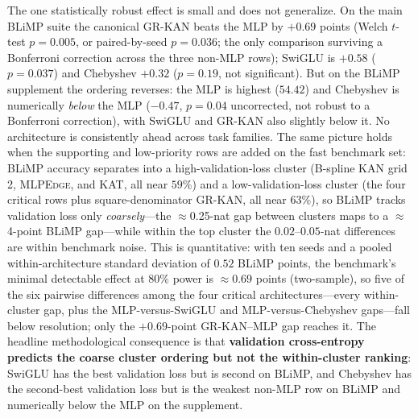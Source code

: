 \documentclass{article}
\newcommand{\modelname}[1]{\textsc{#1}}
\newcommand{\grkan}{\modelname{GR-KAN}}
\newcommand{\mlpedge}{\modelname{MLPEdge}}
\begin{document}
The one statistically robust effect is small and does not generalize. On the main BLiMP suite the canonical \grkan{} beats the MLP by \(+0.69\) points (Welch \(t\)-test \(p=0.005\), or paired-by-seed \(p=0.036\); the only comparison surviving a Bonferroni correction across the three non-MLP rows); SwiGLU is \(+0.58\) (\(p=0.037\)) and Chebyshev \(+0.32\) (\(p=0.19\), not significant). But on the BLiMP supplement the ordering reverses: the MLP is highest (\(54.42\)) and Chebyshev is numerically \emph{below} the MLP (\(-0.47\), \(p=0.04\) uncorrected, not robust to a Bonferroni correction), with SwiGLU and \grkan{} also slightly below it. No architecture is consistently ahead across task families. The same picture holds when the supporting and low-priority rows are added on the fast benchmark set: BLiMP accuracy separates into a high-validation-loss cluster (B-spline KAN grid 2, \mlpedge{}, and KAT, all near \(59\%\)) and a low-validation-loss cluster (the four critical rows plus square-denominator \grkan{}, all near \(63\%\)), so BLiMP tracks validation loss only \emph{coarsely}---the \(\approx\)0.25-nat gap between clusters maps to a \(\approx\)4-point BLiMP gap---while within the top cluster the \(0.02\)--\(0.05\)-nat differences are within benchmark noise. This is quantitative: with ten seeds and a pooled within-architecture standard deviation of \(0.52\) BLiMP points, the benchmark's minimal detectable effect at \(80\%\) power is \(\approx0.69\) points (two-sample), so five of the six pairwise differences among the four critical architectures---every within-cluster gap, plus the MLP-versus-SwiGLU and MLP-versus-Chebyshev gaps---fall below resolution; only the \(+0.69\)-point \grkan{}--MLP gap reaches it. The headline methodological consequence is that \textbf{validation cross-entropy predicts the coarse cluster ordering but not the within-cluster ranking}: SwiGLU has the best validation loss but is second on BLiMP, and Chebyshev has the second-best validation loss but is the weakest non-MLP row on BLiMP and numerically below the MLP on the supplement.
\end{document}
